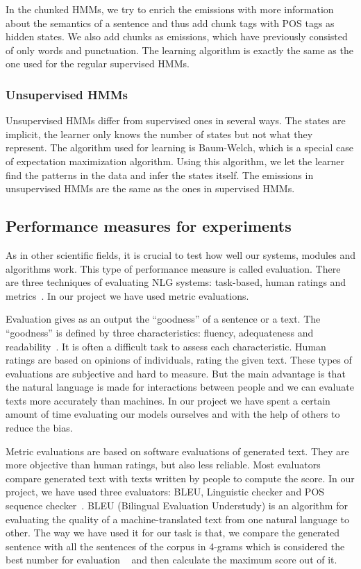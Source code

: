 \documentclass[a4paper,12pt]{article}
\begin{document}
In the chunked HMMs, we try to enrich the emissions with more
information about the semantics of a sentence and thus add chunk tags with POS
tags as hidden states. We also add chunks as emissions, which have previously
consisted of only words and punctuation. The learning algorithm is exactly the
same as the one used for the regular supervised HMMs.

\subsubsection{Unsupervised HMMs}
Unsupervised HMMs differ from supervised ones in several ways. The states are
implicit, the learner only knows the number of states but not what they
represent. The algorithm used for learning is Baum-Welch, which is a special
case of expectation maximization algorithm. Using this algorithm, we let the
learner find the patterns in the data and infer the states itself. The emissions
in unsupervised HMMs are the same as the ones in supervised HMMs.


\subsection {Performance measures for experiments}

As in other scientific fields, it is crucial to test how well our systems,
modules and algorithms work. This type of performance measure is called
evaluation. There are three techniques of evaluating NLG systems: task-based,
human ratings and metrics~\cite{evalnlg}. In our project we have used
metric evaluations.

Evaluation gives as an output the ``goodness'' of a sentence or a text. The
``goodness'' is defined by three characteristics: fluency, adequateness and
readability~\cite{evalmethods}. It is often a difficult task to assess each
characteristic.
Human ratings are based on opinions of individuals, rating the given
text. These types of evaluations are subjective and hard to measure. But the
main advantage is that the natural language is made for interactions between
people and we can evaluate texts more accurately than machines. In our project
we have spent a certain amount of time evaluating our models ourselves and with
the help of others to reduce the bias.

Metric evaluations are based on software evaluations of generated text. They are
more objective than human ratings, but also less reliable. Most evaluators
compare generated text with texts written by people to compute the score. In our
project, we have used three evaluators: BLEU, Linguistic checker and POS
sequence checker~\cite{autoeval}.
BLEU (Bilingual Evaluation Understudy) is an algorithm for evaluating the quality of a 
machine-translated text from one natural language to other. The way we have used it 
for our task is that, we compare the generated sentence with all the sentences of the
corpus in 4-grams which is considered the best number for evaluation ~\cite{bleueval}
and then calculate the maximum score out of it.
\end{document}
